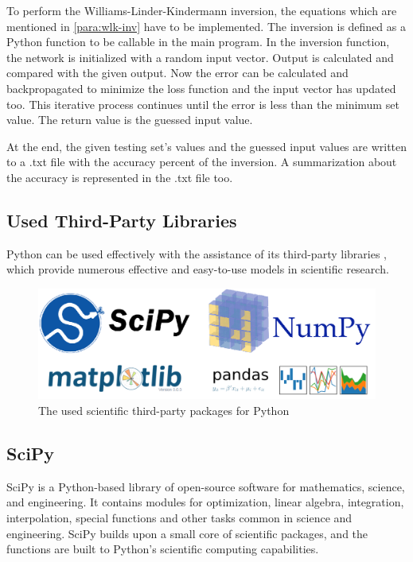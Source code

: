 To perform the Williams-Linder-Kindermann inversion, the equations which are mentioned in \autoref{para:wlk-inv} have to be implemented. The inversion is defined as a Python function to be callable in the main program. In the inversion function, the network is initialized with a random input vector. Output is calculated and compared with the given output. Now the error can be calculated and backpropagated to minimize the loss function and the input vector has updated too. This iterative process continues until the error is less than the minimum set value. The return value is the guessed input value. \smallskip

At the end, the given testing set's values and the guessed input values are written to a .txt file with the accuracy percent of the inversion. A summarization about the accuracy is represented in the .txt file too.



\subsection{Used Third-Party Libraries}

Python can be used effectively with the assistance of its third-party libraries \cite{scipy-url}, which provide numerous effective and easy-to-use models in scientific research. 

\begin{figure}[h]
	\centering
	\includegraphics[height=0.3\linewidth]{./figures/scipy}
	\caption{The used scientific third-party packages for Python}
	\label{fig:scipy}
\end{figure}

\subsection*{SciPy}

SciPy is a Python-based library of open-source software for mathematics, science, and engineering. It contains modules for optimization, linear algebra, integration, interpolation, special functions and other tasks common in science and engineering. SciPy builds upon a small core of scientific packages, and the functions are built to Python's scientific computing capabilities. \bigskip

